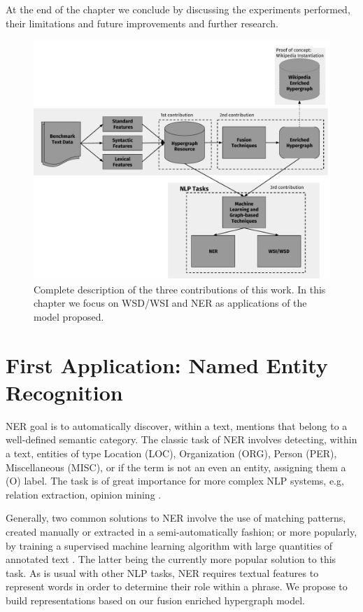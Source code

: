 At the end of the chapter we conclude by discussing the experiments performed, their limitations and  future improvements and further research. 

\begin{figure}
\centering
\includegraphics[width=.7\linewidth]{images/Chapitre4/main_diag2.pdf}
\caption{Complete description of the three contributions of this work. In this chapter we focus on  WSD/WSI and NER as applications of the model proposed.}
\label{fig:main_diag2}
\end{figure}

\section{First Application: Named Entity Recognition}
\label{sec:ner}


 NER goal is to automatically discover, within a text, mentions that belong to a well-defined semantic category. The classic task of NER involves detecting, within a text, entities of type Location (LOC), Organization (ORG), Person (PER), Miscellaneous (MISC), or if the term is not an even an entity, assigning them a (O) label. The task is of great importance for more complex NLP systems, e.g, relation extraction, opinion mining \cite{nadeau2007survey}.  
 
 Generally, two common solutions to NER involve the use of matching patterns, created manually or extracted in a semi-automatically fashion\cite{gupta2015distantly}; or more popularly, by training a supervised machine learning algorithm with large quantities of annotated text \cite{mining12Book} . The latter being the currently more popular solution to this task. As is usual with other NLP tasks, NER  requires textual features to represent words in order to determine their role within a phrase. We propose to build representations based on our fusion enriched hypergraph model.


